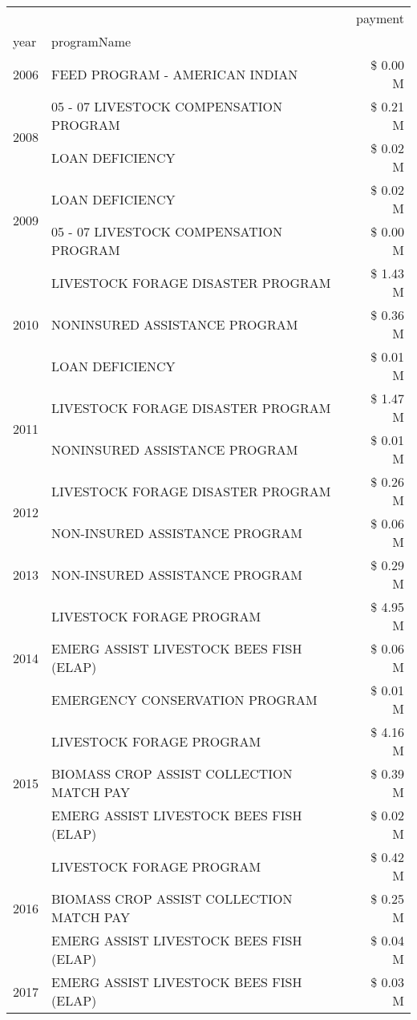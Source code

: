 \begin{tabular}{llr}
\toprule
 &  & payment \\
year & programName &  \\
\midrule
2006 & FEED PROGRAM - AMERICAN INDIAN & \$ 0.00 M \\
\cline{1-3}
\multirow[t]{2}{*}{2008} & 05 - 07 LIVESTOCK COMPENSATION PROGRAM & \$ 0.21 M \\
 & LOAN DEFICIENCY & \$ 0.02 M \\
\cline{1-3}
\multirow[t]{2}{*}{2009} & LOAN DEFICIENCY & \$ 0.02 M \\
 & 05 - 07 LIVESTOCK COMPENSATION PROGRAM & \$ 0.00 M \\
\cline{1-3}
\multirow[t]{3}{*}{2010} & LIVESTOCK FORAGE DISASTER  PROGRAM & \$ 1.43 M \\
 & NONINSURED ASSISTANCE PROGRAM & \$ 0.36 M \\
 & LOAN DEFICIENCY & \$ 0.01 M \\
\cline{1-3}
\multirow[t]{2}{*}{2011} & LIVESTOCK FORAGE DISASTER PROGRAM & \$ 1.47 M \\
 & NONINSURED ASSISTANCE PROGRAM & \$ 0.01 M \\
\cline{1-3}
\multirow[t]{2}{*}{2012} & LIVESTOCK FORAGE DISASTER PROGRAM & \$ 0.26 M \\
 & NON-INSURED ASSISTANCE PROGRAM & \$ 0.06 M \\
\cline{1-3}
2013 & NON-INSURED ASSISTANCE PROGRAM & \$ 0.29 M \\
\cline{1-3}
\multirow[t]{3}{*}{2014} & LIVESTOCK FORAGE PROGRAM & \$ 4.95 M \\
 & EMERG ASSIST LIVESTOCK BEES FISH (ELAP) & \$ 0.06 M \\
 & EMERGENCY CONSERVATION PROGRAM & \$ 0.01 M \\
\cline{1-3}
\multirow[t]{3}{*}{2015} & LIVESTOCK FORAGE PROGRAM & \$ 4.16 M \\
 & BIOMASS CROP ASSIST COLLECTION MATCH PAY & \$ 0.39 M \\
 & EMERG ASSIST LIVESTOCK BEES FISH (ELAP) & \$ 0.02 M \\
\cline{1-3}
\multirow[t]{3}{*}{2016} & LIVESTOCK FORAGE PROGRAM                      & \$ 0.42 M \\
 & BIOMASS CROP ASSIST COLLECTION MATCH PAY      & \$ 0.25 M \\
 & EMERG ASSIST LIVESTOCK BEES FISH (ELAP)       & \$ 0.04 M \\
\cline{1-3}
2017 & EMERG ASSIST LIVESTOCK BEES FISH (ELAP) & \$ 0.03 M \\

\end{tabular}
